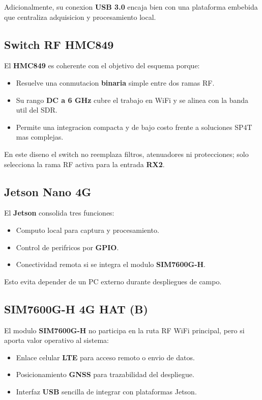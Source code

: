 \documentclass[11pt]{article}
\begin{document}
Adicionalmente, su conexion \textbf{USB 3.0} encaja bien con una plataforma embebida que centraliza adquisicion y procesamiento local.

\subsection{Switch RF HMC849}

El \textbf{HMC849} es coherente con el objetivo del esquema porque:

\begin{itemize}[leftmargin=*]
    \item Resuelve una conmutacion \textbf{binaria} simple entre dos ramas RF.
    \item Su rango \textbf{DC a 6 GHz} cubre el trabajo en WiFi y se alinea con la banda util del SDR.
    \item Permite una integracion compacta y de bajo costo frente a soluciones SP4T mas complejas.
\end{itemize}

En este diseno el switch no reemplaza filtros, atenuadores ni protecciones; solo selecciona la rama RF activa para la entrada \textbf{RX2}.

\subsection{Jetson Nano 4G}

El \textbf{Jetson} consolida tres funciones:

\begin{itemize}[leftmargin=*]
    \item Computo local para captura y procesamiento.
    \item Control de perifricos por \textbf{GPIO}.
    \item Conectividad remota si se integra el modulo \textbf{SIM7600G-H}.
\end{itemize}

Esto evita depender de un PC externo durante despliegues de campo.

\subsection{SIM7600G-H 4G HAT (B)}

El modulo \textbf{SIM7600G-H} no participa en la ruta RF WiFi principal, pero si aporta valor operativo al sistema:

\begin{itemize}[leftmargin=*]
    \item Enlace celular \textbf{LTE} para acceso remoto o envio de datos.
    \item Posicionamiento \textbf{GNSS} para trazabilidad del despliegue.
    \item Interfaz \textbf{USB} sencilla de integrar con plataformas Jetson.
\end{itemize}
\end{document}
